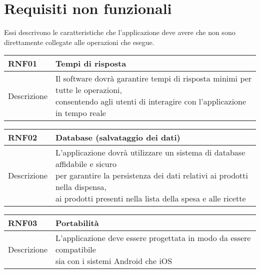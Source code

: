 \newpage

\section{Requisiti non funzionali}

Essi descrivono le caratteristiche che l'applicazione deve avere che non sono direttamente collegate alle operazioni che esegue.

\begin{table}[H]
  \begin{flushleft}
    \begin{tabular}{l|l}
      \toprule
      \textbf{RNF01} & \textbf{Tempi di risposta}\\
      \midrule
      Descrizione & \makecell{Il software dovrà garantire tempi di risposta minimi per tutte le operazioni,\\ consentendo agli utenti di interagire con l'applicazione in tempo reale}\\
      \bottomrule
    \end{tabular}
  \end{flushleft}
\end{table}

\begin{table}[H]
  \begin{flushleft}
    \begin{tabular}{l|l}
      \toprule
      \textbf{RNF02} & \textbf{Database (salvataggio dei dati)}\\
      \midrule
      Descrizione & \makecell{L'applicazione dovrà utilizzare un sistema di database affidabile e sicuro \\ per garantire la persistenza dei dati relativi ai prodotti nella dispensa, \\
      ai prodotti presenti nella lista della spesa e alle ricette}\\
      \bottomrule
    \end{tabular}
  \end{flushleft}
\end{table}

\begin{table}[H]
  \begin{flushleft}
    \begin{tabular}{l|l}
      \toprule
      \textbf{RNF03} & \textbf{Portabilità}\\
      \midrule
      Descrizione & \makecell{L'applicazione deve essere progettata in modo da essere compatibile \\ sia con i sistemi Android che iOS}\\
      \bottomrule
    \end{tabular}
  \end{flushleft}
\end{table}

